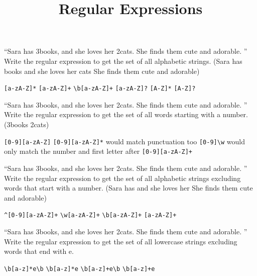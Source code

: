 \documentclass[theme=sleek, randomorder, hidesidemenu]{webquiz}
\title{Regular Expressions}
\begin{document}
\begin{question}
  ``Sara has 3books, and she loves her 2cats. She finds them cute and adorable. ''\\
  Write the regular expression to get the set of all alphabetic strings.
  (Sara has books and she loves her cats She finds them cute and adorable)
  \begin{choice}[columns=2]
    \incorrect \verb|[a-zA-Z]*|
    \correct \verb|[a-zA-Z]+|
    \incorrect \verb|\b[a-zA-Z]+|
    \incorrect \verb|[a-zA-Z]?|
    \incorrect \verb|[A-Z]*|
    \incorrect \verb|[A-Z]?|
  \end{choice}
\end{question}

\begin{question}
  ``Sara has 3books, and she loves her 2cats. She finds them cute and adorable. ''\\
  Write the regular expression to get the set of all words starting with a number.
  (3books 2cats)
  \begin{choice}[columns=2]
    \incorrect \verb|[0-9][a-zA-Z]|
    \incorrect \verb|[0-9][a-zA-Z]*| \feedback would match punctuation too
    \incorrect \verb|[0-9]\w| \feedback would only match the number and first letter after
    \correct \verb|[0-9][a-zA-Z]+|
  \end{choice}
\end{question}

\begin{question}
  ``Sara has 3books, and she loves her 2cats. She finds them cute and adorable. ''\\
  Write the regular expression to get the set of all alphabetic strings excluding words that start with a number.
  (Sara has and she loves her She finds them cute and adorable)
  \begin{choice}[columns=2]
    \incorrect \verb|^[0-9][a-zA-Z]+|
    \incorrect \verb|\w[a-zA-Z]+|
    \correct \verb|\b[a-zA-Z]+|
    \incorrect \verb|[a-zA-Z]+|
  \end{choice}
\end{question}

\begin{question}
  ``Sara has 3books, and she loves her 2cats. She finds them cute and adorable. ''\\
  Write the regular expression to get the set of all lowercase strings excluding words that end with e.
  \begin{choice}[columns=2]
    \incorrect \verb|\b[a-z]*e\b|
    \incorrect \verb|\b[a-z]*e|
    \correct \verb|\b[a-z]+e\b|
    \incorrect \verb|\b[a-z]+e|
  \end{choice}
\end{question}
\end{document}
